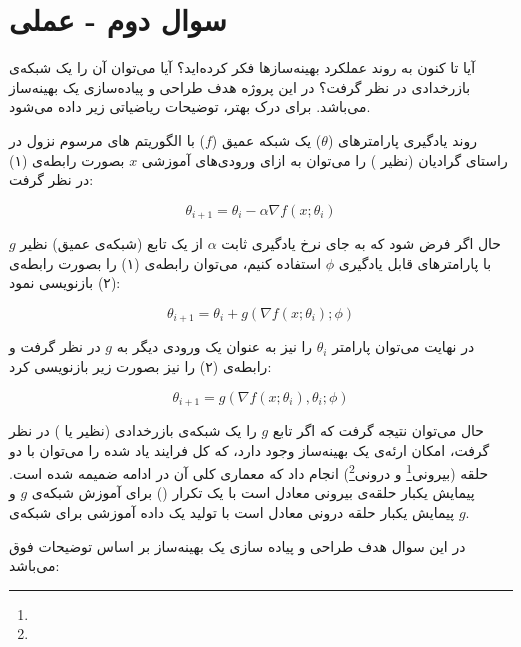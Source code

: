 \section{سوال دوم - عملی}

آیا تا کنون به روند عملکرد بهینه‌سازها فکر کرده‌اید؟ آیا می‌توان آن را یک شبکه‌ی بازرخدادی در نظر گرفت؟ در این پروژه هدف طراحی و پیاده‌سازی یک بهینه‌ساز می‌باشد. برای درک بهتر، توضیحات ریاضیاتی زیر داده می‌شود.



روند یادگیری پارامترهای ($\theta$) یک شبکه عمیق ($f$) با الگوریتم های مرسوم نزول در راستای گرادیان (نظیر ) را می‌توان به ازای ورودی‌های آموزشی $x$ بصورت رابطه‌ی (۱) در نظر گرفت:

\begin{equation}
	\theta_{i+1} = \theta_i - \alpha \nabla f(x; \theta_i)
\end{equation}

حال اگر فرض شود که به جای نرخ یادگیری ثابت $\alpha$ از یک تابع (شبکه‌ی عمیق) نظیر $g$ با پارامترهای قابل یادگیری $\phi$ استفاده کنیم، می‌توان رابطه‌ی (۱) را بصورت رابطه‌ی (۲) بازنویسی نمود:

\begin{equation}
	\theta_{i+1} = \theta_i + g(\nabla f(x; \theta_i); \phi)
\end{equation}

در نهایت می‌توان پارامتر $\theta_i$ را نیز به عنوان یک ورودی دیگر به $g$ در نظر گرفت و رابطه‌ی (۲) را نیز بصورت زیر بازنویسی کرد:

\begin{equation}
	\theta_{i+1} = g(\nabla f(x; \theta_i), \theta_i; \phi)
\end{equation}

حال می‌توان نتیجه گرفت که اگر تابع $g$ را یک شبکه‌ی بازرخدادی (نظیر  یا ) در نظر گرفت، امکان ارئه‌ی یک بهینه‌ساز وجود دارد، که کل فرایند یاد شده را می‌توان با دو حلقه (بیرونی\footnote{} و درونی\footnote{}) انجام داد که معماری کلی آن در ادامه ضمیمه شده است. پیمایش یکبار حلقه‌ی بیرونی معادل است با یک تکرار () برای آموزش شبکه‌ی $g$ و پیمایش یکبار حلقه درونی معادل است با تولید یک داده آموزشی برای شبکه‌ی $g$.



در این سوال هدف طراحی و پیاده سازی یک بهینه‌ساز بر اساس توضیحات فوق می‌باشد:

